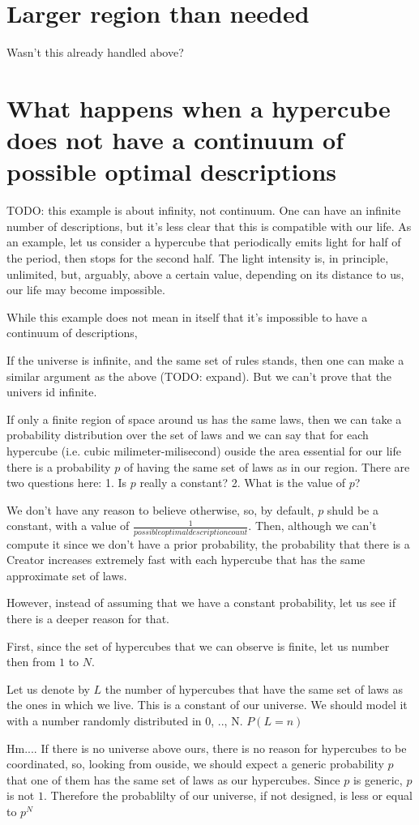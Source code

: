 \documentclass[a4paper
,draft
]{article}
\begin{document}
\section{Larger region than needed}

Wasn't this already handled above?

\section{What happens when a hypercube does not have a continuum of possible optimal descriptions}

TODO: this example is about infinity, not continuum. One can have an infinite number of descriptions, but it's less clear that this is compatible with our life. As an example, let us consider a hypercube that periodically emits light for half of the period, then stops for the second half. The light intensity is, in principle, unlimited, but, arguably, above a certain value, depending on its distance to us, our life may become impossible.

While this example does not mean in itself that it's impossible to have a continuum of descriptions,

If the universe is infinite, and the same set of rules stands, then one can make a similar argument as the above (TODO: expand). But we can't prove that the univers id infinite.

If only a finite region of space around us has the same laws, then we can take a probability distribution over the set of laws and we can say that for each hypercube (i.e. cubic milimeter-milisecond) ouside the area essential for our life there is a probability $p$ of having the same set of laws as in our region. There are two questions here: 1. Is $p$ really a constant? 2. What is the value of $p$?

We don't have any reason to believe otherwise, so, by default, $p$ shuld be a constant, with a value of $\frac{1}{possible optimal description count}$. Then, although we can't compute it since we don't have a prior probability, the probability that there is a Creator increases extremely fast with each hypercube that has the same approximate set of laws.

However, instead of assuming that we have a constant probability, let us see if there is a deeper reason for that.

First, since the set of hypercubes that we can observe is finite, let us number then from $1$ to $N$.

Let us denote by $L$ the number of hypercubes that have the same set of laws as the ones in which we live. This is a constant of our universe. We should model it with a number randomly distributed in {0, .., N}. $P(L=n)$

Hm.... If there is no universe above ours, there is no reason for hypercubes to be coordinated, so, looking from ouside, we should expect a generic probability $p$ that one of them has the same set of laws as our hypercubes. Since $p$ is generic, $p$ is not $1$. Therefore the probablilty of our universe, if not designed, is less or equal to $p^N$
\end{document}
